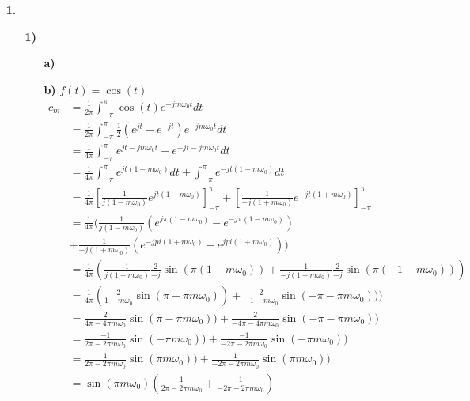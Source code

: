 \documentclass[a4paper,11pt]{article}
\author{\authorinfotitle}
\title{\titleinfo}
\date{\today}
\begin{document}
	\maketitle
	\begin{enumerate}
		\item[\textbf{1.}]
		\begin{enumerate}
			\item[\textbf{1)}]
				\begin{enumerate}
				\item[\textbf{a)}]
				\item[\textbf{b)} $f(t)=\cos(t)$]
				\begin{align*}
					c_m&=\frac{1}{2\pi}\int_{-\pi}^{\pi}\cos(t)e^{-jm\omega_0t}dt\\
					   &=\frac{1}{2\pi}\int_{-\pi}^{\pi}\frac{1}{2}(e^{jt}+e^{-jt})e^{-jm\omega_0t}dt\\
					   &=\frac{1}{4\pi}\int_{-\pi}^{\pi}e^{jt-jm\omega_0t}+e^{-jt-jm\omega_0t}dt\\
					   &=\frac{1}{4\pi}\int_{-\pi}^{\pi}e^{jt(1-m\omega_0)}dt+\int_{-\pi}^{\pi}e^{-jt(1+m\omega_0)}dt\\
					   &=\frac{1}{4\pi}\left[\frac{1}{j(1-m\omega_0)} e^{jt(1-m\omega_0)}\right]_{-\pi}^{\pi}+\left[\frac{1}{-j(1+m\omega_0)}e^{-jt(1+m\omega_0)}\right]_{-\pi}^{\pi}\\
					   &=\frac{1}{4\pi}(\frac{1}{j(1-m\omega_0)}(e^{j\pi(1-m\omega_0)}-e^{-j\pi(1-m\omega_0)})\\&+\frac{1}{-j(1+m\omega_0)}(e^{-jpi(1+m\omega_0)}-e^{jpi(1+m\omega_0)}))\\
					   &=\frac{1}{4\pi}(\frac{1}{j(1-m\omega_0)}\frac{2}{-j}\sin(\pi(1-m\omega_0))+\frac{1}{-j(1+m\omega_0)}\frac{2}{-j}\sin(\pi(-1-m\omega_0)))\\
					   &=\frac{1}{4\pi}(\frac{2}{1-m\omega_0}\sin(\pi-\pi m\omega_0))+\frac{2}{-1-m\omega_0}\sin(-\pi-\pi m\omega_0)))\\
					   &=\frac{2}{4\pi-4\pi m\omega_0}\sin(\pi-\pi m\omega_0))+\frac{2}{-4\pi-4\pi m\omega_0}\sin(-\pi-\pi m\omega_0))\\
					   &=\frac{-1}{2\pi-2\pi m\omega_0}\sin(-\pi m\omega_0))+\frac{-1}{-2\pi-2\pi m\omega_0}\sin(-\pi m\omega_0))\\
					   &=\frac{1}{2\pi-2\pi m\omega_0}\sin(\pi m\omega_0))+\frac{1}{-2\pi-2\pi m\omega_0}\sin(\pi m\omega_0))\\
					   &=\sin(\pi m\omega_0)(\frac{1}{2\pi-2\pi m\omega_0}+\frac{1}{-2\pi-2\pi m\omega_0})\\

\end{align*}
\end{enumerate}
\end{enumerate}
\end{enumerate}
\end{document}
